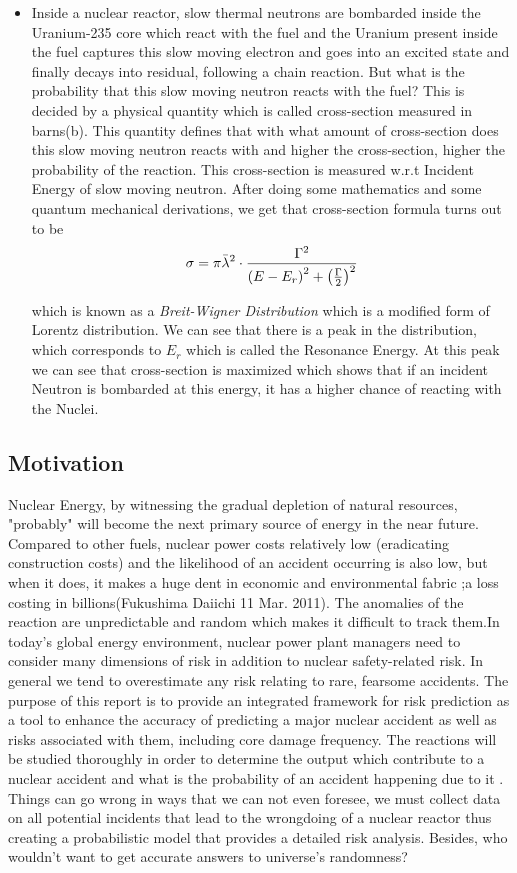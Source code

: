 \documentclass{article}
\begin{document}
\begin{itemize}
\item
  Inside a nuclear reactor, slow thermal neutrons are bombarded inside the Uranium-235 core which react with the fuel and the Uranium present inside the fuel captures this slow moving electron and goes into an excited state and finally decays into residual, following a chain reaction. But what is the probability that this slow moving neutron reacts with the fuel? This is decided by a physical quantity which is called cross-section measured in barns(b). This quantity defines that with what amount of cross-section does this slow moving neutron reacts with and higher the cross-section, higher the probability of the reaction. This cross-section is measured w.r.t Incident Energy of slow moving neutron. After doing some mathematics and some quantum mechanical derivations, we get that cross-section formula turns out to be \[\sigma = \pi \Bar{\lambda}^2\cdot\frac{\Gamma^2}{\left(E - E_{r}\right)^2 + \left(\frac{\Gamma}{2}\right)^2}\]

  which is known as a \textit{Breit-Wigner Distribution} which is a modified form of Lorentz distribution. We can see that there is a peak in the distribution, which corresponds to $E_r$ which is called the Resonance Energy. At this peak we can see that cross-section is maximized which shows that if an incident Neutron is bombarded at this energy, it has a higher chance of reacting with the Nuclei.
\end{itemize}

\subsection{Motivation}
Nuclear Energy, by witnessing the gradual depletion of natural resources, "probably" will become the next primary source of energy in the near future.
Compared to other fuels, nuclear power costs relatively low (eradicating construction costs) and the likelihood of an accident occurring is also low, but when it does, it makes a huge dent in economic and environmental fabric ;a loss costing in billions(Fukushima Daiichi 11 Mar. 2011). The anomalies of the reaction are unpredictable and random which makes it difficult to track them.In today’s global energy environment, nuclear power plant managers need to consider many dimensions of risk in addition to nuclear safety-related risk.  In general we tend to overestimate any risk relating to rare, fearsome accidents. The purpose of this report is to provide an integrated framework for risk prediction as a tool to enhance the accuracy of predicting a major nuclear accident as well as risks associated with them, including core damage frequency. The reactions will be studied thoroughly in order to determine the output which contribute to a nuclear accident and what is the probability of an accident happening due to it . Things can go wrong in ways that we can not even foresee, we must collect data on all potential incidents that lead to the wrongdoing of a nuclear reactor thus creating a probabilistic model that provides a detailed risk analysis. Besides, who wouldn't want to get accurate answers to  universe's randomness?
\end{document}
